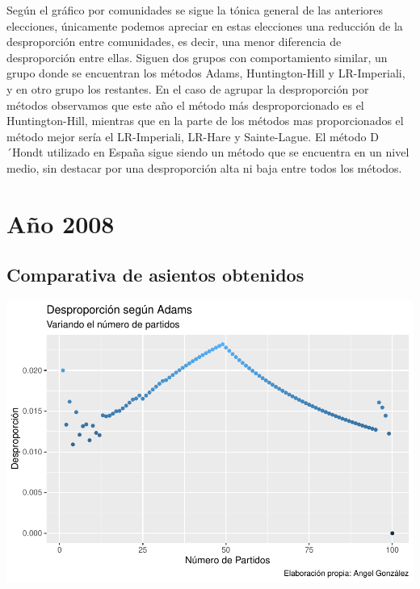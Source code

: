 \documentclass[12pt,a4paper,]{book}
\numberwithin{dummy}{section}
\theoremstyle{ocrenumbox}
\theoremstyle{blacknumex}
\theoremstyle{blacknumbox}
\theoremstyle{ocrenum}
\theoremstyle{ocrenum}
\begin{document}
Según el gráfico por comunidades se sigue la tónica general de las
anteriores elecciones, únicamente podemos apreciar en estas elecciones
una reducción de la desproporción entre comunidades, es decir, una menor
diferencia de desproporción entre ellas. Siguen dos grupos con
comportamiento similar, un grupo donde se encuentran los métodos Adams,
Huntington-Hill y LR-Imperiali, y en otro grupo los restantes. En el
caso de agrupar la desproporción por métodos observamos que este año el
método más desproporcionado es el Huntington-Hill, mientras que en la
parte de los métodos mas proporcionados el método mejor sería el
LR-Imperiali, LR-Hare y Sainte-Lague. El método D´Hondt utilizado en
España sigue siendo un método que se encuentra en un nivel medio, sin
destacar por una desproporción alta ni baja entre todos los métodos.

\hypertarget{auxf1o-2008}{%
\section{Año 2008}\label{auxf1o-2008}}

\hypertarget{comparativa-de-asientos-obtenidos-9}{%
\subsection{Comparativa de asientos
obtenidos}\label{comparativa-de-asientos-obtenidos-9}}

\begin{center}\includegraphics[width=1\linewidth]{figurasR/unnamed-chunk-32-1} \end{center}
\end{document}
